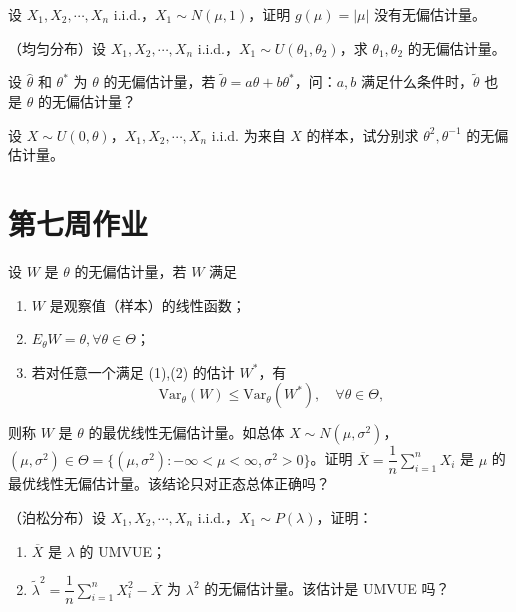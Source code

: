 \begin{homework}[3]
设 $X_1, X_2, \cdots, X_n$ i.i.d.，$X_1 \sim N(\mu, 1)$，证明 $g(\mu) = |\mu|$ 没有无偏估计量。
\end{homework}

\begin{homework}[4]
（均匀分布）设 $X_1, X_2, \cdots, X_n$ i.i.d.，$X_1 \sim U(\theta_1, \theta_2)$，求 $\theta_1, \theta_2$ 的无偏估计量。
\end{homework}

\begin{homework}[5]
设 $\hat{\theta}$ 和 $\theta^*$ 为 $\theta$ 的无偏估计量，若 $\tilde{\theta} = a\hat{\theta} + b\theta^*$，问：$a, b$ 满足什么条件时，$\tilde{\theta}$ 也是 $\theta$ 的无偏估计量？
\end{homework}

\begin{homework}[6]
设 $X \sim U(0,\theta)$，$X_1, X_2, \cdots, X_n$ i.i.d. 为来自 $X$ 的样本，试分别求 $\theta^2, \theta^{-1}$ 的无偏估计量。
\end{homework}
\section{第七周作业}
\begin{homework}[7]
设 $W$ 是 $\theta$ 的无偏估计量，若 $W$ 满足
\begin{enumerate}[(1)]
    \item $W$ 是观察值（样本）的线性函数；
    \item $E_\theta W = \theta, \forall \theta \in \Theta$；
    \item 若对任意一个满足 (1),(2) 的估计 $W^*$，有
    \[
    \mathrm{Var}_\theta(W) \leq \mathrm{Var}_\theta(W^*), \quad \forall \theta \in \Theta,
    \]
\end{enumerate}
则称 $W$ 是 $\theta$ 的最优线性无偏估计量。如总体 $X \sim N(\mu, \sigma^2)$，$(\mu, \sigma^2) \in \Theta = \{(\mu, \sigma^2) : -\infty < \mu < \infty, \sigma^2 > 0\}$。证明 $\overline{X} = \dfrac{1}{n}\sum_{i=1}^{n} X_i$ 是 $\mu$ 的最优线性无偏估计量。该结论只对正态总体正确吗？
\end{homework}

\begin{homework}[11]
（泊松分布）设 $X_1, X_2, \cdots, X_n$ i.i.d.，$X_1 \sim P(\lambda)$，证明：
\begin{enumerate}[(1)]
    \item $\overline{X}$ 是 $\lambda$ 的 UMVUE；
    \item $\tilde{\lambda}^2 = \dfrac{1}{n}\sum_{i=1}^{n} X_i^2 - \overline{X}$ 为 $\lambda^2$ 的无偏估计量。该估计是 UMVUE 吗？
\end{enumerate}
\end{homework}

